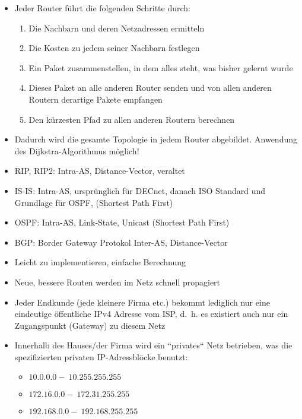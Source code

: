 \begin{itemize}
    \item Jeder Router führt die folgenden Schritte durch:
    \begin{enumerate}
        \item Die Nachbarn und deren Netzadressen ermitteln
        \item Die Kosten zu jedem seiner Nachbarn festlegen
        \item Ein Paket zusammenstellen, in dem alles steht, was bisher gelernt wurde
        \item Dieses Paket an alle anderen Router senden und von allen anderen Routern derartige Pakete empfangen
        \item Den kürzesten Pfad zu allen anderen Routern berechnen
    \end{enumerate}
    \item Dadurch wird die gesamte Topologie in jedem Router abgebildet.
    Anwendung des Dijkstra-Algorithmus möglich!
\end{itemize}

\begin{itemize}
    \item RIP, RIP2: Intra-AS, Distance-Vector, veraltet
    \item IS-IS: Intra-AS, ursprünglich für DECnet, danach ISO Standard und Grundlage für OSPF, (Shortest Path First)
    \item OSPF: Intra-AS, Link-State, Unicast (Shortest Path First)
    \item BGP: Border Gateway Protokol Inter-AS, Distance-Vector
\end{itemize}

\begin{itemize}
    \item Leicht zu implementieren, einfache Berechnung
    \item Neue, bessere Routen werden im Netz schnell propagiert
\end{itemize}

\begin{itemize}
    \item Jeder Endkunde (jede kleinere Firma etc.) bekommt lediglich nur eine eindeutige öffentliche IPv4 Adresse vom ISP, d.\ h. es existiert auch nur ein Zugangspunkt (Gateway) zu diesem Netz
    \item Innerhalb des Hauses/der Firma wird ein ``privates`` Netz betrieben, was die spezifizierten privaten IP-Adressblöcke benutzt:
    \begin{itemize}
        \item \( 10.0.0.0 -\: 10.255.255.255 \)
        \item \( 172.16.0.0 -\: 172.31.255.255 \)
        \item \( 192.168.0.0 -\: 192.168.255.255 \)
    \end{itemize}
\end{itemize}


